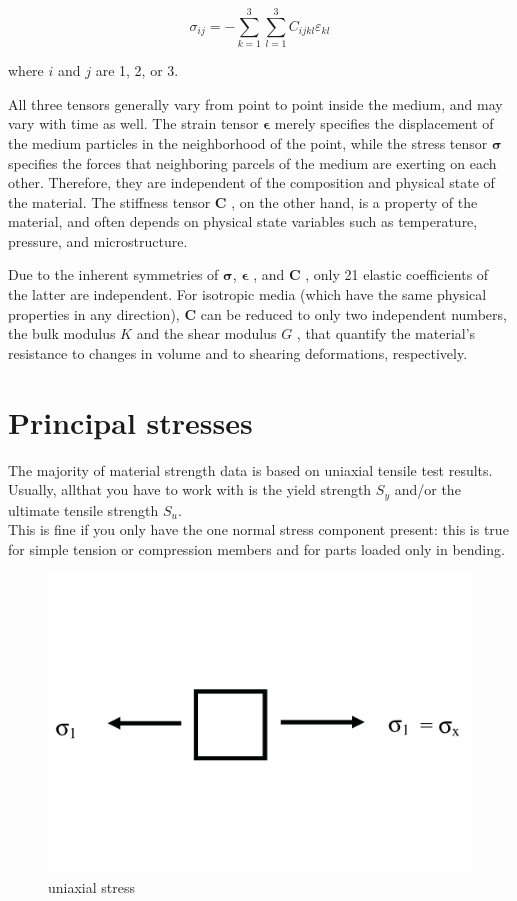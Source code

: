 \begin{equation}
\sigma_{ij} = -\sum_{k=1}^{3} \sum_{l=1}^{3} C_{ijkl} \varepsilon_{kl}
\end{equation}

where $ i $ and $ j $ are 1, 2, or 3.

All three tensors generally vary from point to point inside the medium, and may vary with time as well. The strain tensor $ \mathbf{\epsilon} $  merely specifies the displacement of the medium particles in the neighborhood of the point, while the stress tensor $ \mathbf{\sigma} $  specifies the forces that neighboring parcels of the medium are exerting on each other. Therefore, they are independent of the composition and physical state of the material. The stiffness tensor $ \mathbf{C} $ , on the other hand, is a property of the material, and often depends on physical state variables such as temperature, pressure, and microstructure.

Due to the inherent symmetries of $ \mathbf{\sigma} $, $ \mathbf{\epsilon} $ , and $ \mathbf{C} $ , only 21 elastic coefficients of the latter are independent. For isotropic media (which have the same physical properties in any direction), $ \mathbf{C} $ can be reduced to only two independent numbers, the bulk modulus $ K $ and the shear modulus $ G $ , that quantify the material's resistance to changes in volume and to shearing deformations, respectively.

\section{Principal stresses}
The majority of material strength data is based on uniaxial tensile test results. Usually, allthat you have to work with is the yield strength $ S_y $ and/or the ultimate tensile strength $ S_u $. \\

This is fine if you only have the one normal stress component present: this is true for simple tension or compression members and for parts loaded only in bending.

\begin{figure}[h!]
	\centering
	\includegraphics[width=0.3\linewidth]{figure/uniaxial_stress}
	\caption{uniaxial stress}
	\label{fig:uniaxialstress}
\end{figure}

